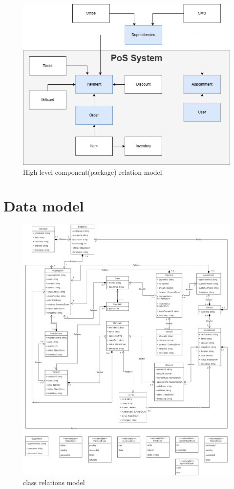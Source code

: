 \documentclass{article}
\begin{document}
        \begin{figure}[H]
        \centering
        \includegraphics[width=0.9\linewidth]{PSP/lab-1/diagrams/architecture/highView.png}
        \caption{High level component(package) relation model}
        \label{}
        \end{figure}
        
    \section{Data model}
    \begin{figure}[H]
        \centering
        \includegraphics[width=1.0\linewidth]{PSP/lab-1/diagrams/data-model/data-model.png}
        \caption{class relations model}
        \label{data_model}
        \end{figure}
\end{document}
